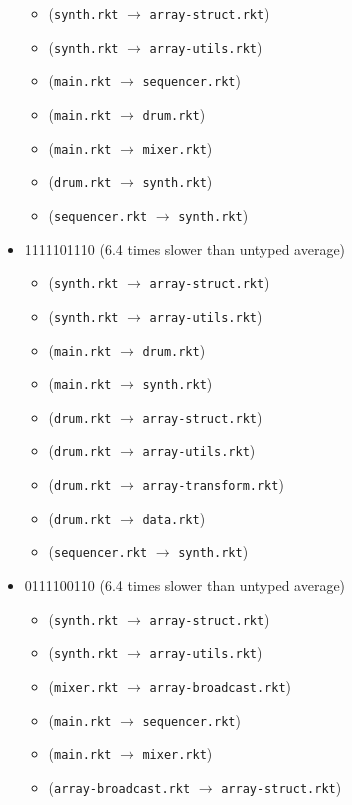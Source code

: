 \documentclass{article}
\newcommand{\mono}[1]{\texttt{#1}}
\begin{document}
\begin{itemize}
\begin{itemize}
  \item (\mono{synth.rkt} $\rightarrow$ \mono{array-struct.rkt})
  \item (\mono{synth.rkt} $\rightarrow$ \mono{array-utils.rkt})
  \item (\mono{main.rkt} $\rightarrow$ \mono{sequencer.rkt})
  \item (\mono{main.rkt} $\rightarrow$ \mono{drum.rkt})
  \item (\mono{main.rkt} $\rightarrow$ \mono{mixer.rkt})
  \item (\mono{drum.rkt} $\rightarrow$ \mono{synth.rkt})
  \item (\mono{sequencer.rkt} $\rightarrow$ \mono{synth.rkt})
  \end{itemize}
\item 1111101110 (6.4 times slower than untyped average)
  \begin{itemize}
  \item (\mono{synth.rkt} $\rightarrow$ \mono{array-struct.rkt})
  \item (\mono{synth.rkt} $\rightarrow$ \mono{array-utils.rkt})
  \item (\mono{main.rkt} $\rightarrow$ \mono{drum.rkt})
  \item (\mono{main.rkt} $\rightarrow$ \mono{synth.rkt})
  \item (\mono{drum.rkt} $\rightarrow$ \mono{array-struct.rkt})
  \item (\mono{drum.rkt} $\rightarrow$ \mono{array-utils.rkt})
  \item (\mono{drum.rkt} $\rightarrow$ \mono{array-transform.rkt})
  \item (\mono{drum.rkt} $\rightarrow$ \mono{data.rkt})
  \item (\mono{sequencer.rkt} $\rightarrow$ \mono{synth.rkt})
  \end{itemize}
\item 0111100110 (6.4 times slower than untyped average)
  \begin{itemize}
  \item (\mono{synth.rkt} $\rightarrow$ \mono{array-struct.rkt})
  \item (\mono{synth.rkt} $\rightarrow$ \mono{array-utils.rkt})
  \item (\mono{mixer.rkt} $\rightarrow$ \mono{array-broadcast.rkt})
  \item (\mono{main.rkt} $\rightarrow$ \mono{sequencer.rkt})
  \item (\mono{main.rkt} $\rightarrow$ \mono{mixer.rkt})
  \item (\mono{array-broadcast.rkt} $\rightarrow$ \mono{array-struct.rkt})

\end{itemize}
\end{itemize}
\end{document}
